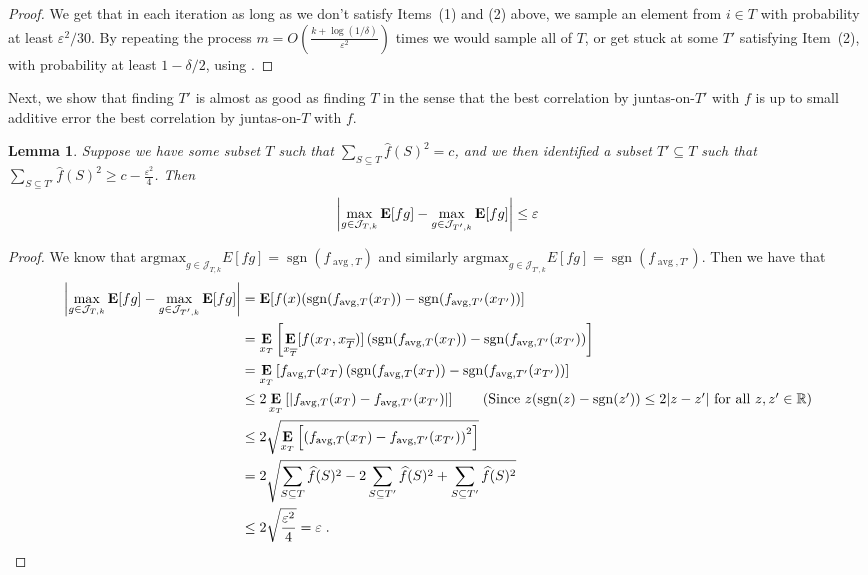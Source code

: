 \documentclass[10pt,a4paper]{article}
\theoremstyle{plain}
\newtheorem{lemma}[theorem]{Lemma}
\theoremstyle{remark}
\theoremstyle{plain}
\providecommand{\R}{}
\renewcommand{\R}{\mathbb{R}}
\providecommand{\E}{}
\renewcommand{\E}{\mathop{\bf E\/}}
\newcommand{\sgn}{\operatorname{sgn}}
\newcommand{\eps}{\varepsilon}
\renewcommand{\hat}{\widehat}
\newcommand{\avg}{\operatorname{avg}}
\newcommand{\argmax}{\textrm{argmax}}
\renewcommand{\epsilon}{\varepsilon}
\begin{document}
\begin{proof}
We get that in each iteration as long as we don't satisfy Items~(1) and (2) above, we sample an element from $i\in T$ with probability at least $\eps^2/30$. By repeating the process $m = O(\frac{k+\log(1/\delta)}{\eps^2})$ times we would sample all of $T$, or get stuck at some $T'$ satisfying Item~(2), with probability at least $1-\delta/2$, using .
\end{proof}

Next, we show that finding $T'$ is almost as good as finding $T$ in the sense that the best correlation by juntas-on-$T'$ with $f$ is up to small additive error the best correlation by juntas-on-$T$ with $f$.
\begin{lemma}
\label{lemma:small-mass-loss-okay}
Suppose we have some subset $T$ such that $\sum_{S\subseteq T} \hat{f}(S)^2  = c$, and we then identified a subset $T' \subseteq T$ such that $\sum_{S \subseteq T'} \hat{f}(S)^2 \geq c - \frac{\epsilon^2}{4}$. Then 
$$\left | \max_{g \in \mathcal{J}_{T,k}} \E[fg] -  \max_{g \in \mathcal{J}_{T',k}} \E[fg] \right | \leq \epsilon$$
\end{lemma}
\begin{proof}
We know that $\argmax_{g \in \mathcal{J}_{T,k}}E[fg] = \sgn(f_{\avg,T})$ and similarly $\argmax_{g \in \mathcal{J}_{T',k}}E[fg] = \sgn(f_{\avg,T'})$. 
Then we have that 
\begin{align*}
\left | \max_{g \in \mathcal{J}_{T,k}} \E[fg] -  \max_{g \in \mathcal{J}_{T',k}} \E[fg] \right | &= \E[f(x)(\sgn(f_{\avg,T}(x_T)) - \sgn(f_{\avg,T'}(x_{T'}))] \\
&= \E_{x_T}\left [ \E_{x_{\overline{T}}} [f(x_T, x_{\overline{T}})] \left (\sgn(f_{\avg,T}(x_T)) - \sgn(f_{\avg,T'}(x_{T'})\right )\right ] \\
&= \E_{x_T}\left [ f_{\avg,T}(x_T) \left (\sgn(f_{\avg,T}(x_T)) - \sgn(f_{\avg,T'}(x_{T'})\right )\right ] \\
&\leq 2 \E_{x_T}\left [ \left |f_{\avg,T}(x_T) - f_{\avg,T'}(x_{T'})\right |\right ] \tag{Since $z(\sgn(z) - \sgn(z')) \leq 2 |z - z'|$ for all $z,z'\in \R$} \\
&\leq 2 \sqrt{\E_{x_T}\left [ \left (f_{\avg,T}(x_T) - f_{\avg,T'}(x_{T'})\right )^2\right ]} \\
&= 2 \sqrt{\sum_{S \subseteq T} \hat{f}(S)^2 - 2 \sum_{S \subseteq T'} \hat{f}(S)^2 + \sum_{S \subseteq T'} \hat{f}(S)^2} \\
&\leq 2 \sqrt{\frac{\epsilon^2}{4}} = \epsilon\;.\qedhere
\end{align*}
\end{proof}
\end{document}
